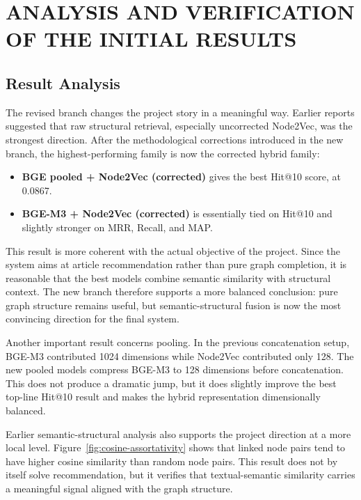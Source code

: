 \chapter{ANALYSIS AND VERIFICATION OF THE INITIAL RESULTS}
\thispagestyle{empty}

\section{Result Analysis}

The revised branch changes the project story in a meaningful way. Earlier
reports suggested that raw structural retrieval, especially uncorrected
Node2Vec, was the strongest direction. After the methodological corrections
introduced in the new branch, the highest-performing family is now the corrected
hybrid family:
\begin{itemize}
    \item \textbf{BGE pooled + Node2Vec (corrected)} gives the best Hit@10
    score, at 0.0867.
    \item \textbf{BGE-M3 + Node2Vec (corrected)} is essentially tied on Hit@10
    and slightly stronger on MRR, Recall, and MAP.
\end{itemize}

This result is more coherent with the actual objective of the project. Since
the system aims at article recommendation rather than pure graph completion, it
is reasonable that the best models combine semantic similarity with structural
context. The new branch therefore supports a more balanced conclusion: pure
graph structure remains useful, but semantic-structural fusion is now the most
convincing direction for the final system.

Another important result concerns pooling. In the previous concatenation setup,
BGE-M3 contributed 1024 dimensions while Node2Vec contributed only 128. The
new pooled models compress BGE-M3 to 128 dimensions before concatenation. This
does not produce a dramatic jump, but it does slightly improve the best top-line
Hit@10 result and makes the hybrid representation dimensionally balanced.

Earlier semantic-structural analysis also supports the project direction at a
more local level. Figure~\ref{fig:cosine-assortativity} shows that linked node
pairs tend to have higher cosine similarity than random node pairs. This result
does not by itself solve recommendation, but it verifies that textual-semantic
similarity carries a meaningful signal aligned with the graph structure.

